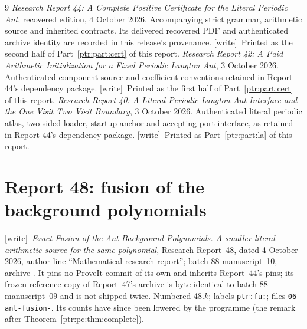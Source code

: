 \documentclass[11pt,letterpaper]{article}
\makeatletter
\newcommand{\ptrhead}{Front matter}
\theoremstyle{definition}\newtheorem{definition}[theorem]{Definition}
\theoremstyle{remark}\newtheorem{remark}[theorem]{Remark}
\newcommand{\ptrR}{}
\newcommand{\ptrstart}[2]{%
  \renewcommand{\ptrR}{#1}\setcounter{section}{0}\setcounter{equation}{0}%
  \def\Hy@chapapp{section}%
  \renewcommand{\thesection}{#1.\arabic{section}}%
  \renewcommand{\theHsection}{#1.\arabic{section}}%
  \renewcommand{\theequation}{#1.\arabic{equation}}%
  \renewcommand{\theHequation}{#1.\arabic{equation}}%
  \renewcommand{\ptrhead}{#2}}
\newcommand{\wtag}{\textup{[write]}}
\makeatother
\begin{document}
\begingroup\small\begin{thebibliography}{9}
 \emph{Research Report 44: A Complete Positive Certificate for the Literal Periodic Ant}, recovered edition, 4 October 2026. Accompanying strict grammar, arithmetic source and inherited contracts. Its delivered recovered PDF and authenticated archive identity are recorded in this release's provenance. \wtag\ Printed as the second half of Part~\ref{ptr:part:cert} of this report.
 \emph{Research Report 42: A Paid Arithmetic Initialization for a Fixed Periodic Langton Ant}, 3 October 2026. Authenticated component source and coefficient conventions retained in Report 44's dependency package. \wtag\ Printed as the first half of Part~\ref{ptr:part:cert} of this report.
 \emph{Research Report 40: A Literal Periodic Langton Ant Interface and the One Visit Two Visit Boundary}, 3 October 2026. Authenticated literal periodic atlas, two-sided loader, startup anchor and accepting-port interface, as retained in Report 44's dependency package. \wtag\ Printed as Part~\ref{ptr:part:la} of this report.
\end{thebibliography}\endgroup
\clearpage
\ptrstart{48}{Part IV: Report 48}
\label{ptr:fu:sec:intro}
\section*{Report 48: fusion of the background polynomials}
\noindent\wtag\ \emph{Exact Fusion of the Ant Background Polynomials. A
smaller literal arithmetic source for the same polynomial}, Research
Report~48, dated 4 October 2026, author line ``Mathematical research
report''; batch-88 manuscript~10, archive
. It pins no
ProveIt commit of its own and inherits Report~44's pins; its frozen reference
copy of Report~47's archive is byte-identical to batch-88 manuscript~09 and
is not shipped twice. Numbered 48.$k$; labels \texttt{ptr:fu:}; files
\texttt{06-ant-fusion-}. Its counts have since been lowered by the
programme (the remark after Theorem~\ref{ptr:pc:thm:complete}).
\end{document}
